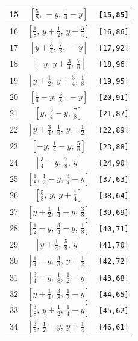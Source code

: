 \documentclass[fleqn,8pt]{jsarticle}
\begin{document}
\begin{longtable}{ccc}
15 & $\left[ \frac{5}{8},\, - y,\, \frac{1}{4} - y \right]$ & {\tt [15,85]} \\ \hline
16 & $\left[ \frac{1}{8},\, y + \frac{1}{2},\, y + \frac{3}{4} \right]$ & {\tt [16,86]} \\ \hline
17 & $\left[ y + \frac{3}{4},\, \frac{7}{8},\, - y \right]$ & {\tt [17,92]} \\ \hline
18 & $\left[ - y,\, y + \frac{3}{4},\, \frac{7}{8} \right]$ & {\tt [18,96]} \\ \hline
19 & $\left[ y + \frac{1}{2},\, y + \frac{3}{4},\, \frac{1}{8} \right]$ & {\tt [19,95]} \\ \hline
20 & $\left[ \frac{1}{4} - y,\, \frac{5}{8},\, - y \right]$ & {\tt [20,91]} \\ \hline
21 & $\left[ y,\, \frac{3}{4} - y,\, \frac{7}{8} \right]$ & {\tt [21,87]} \\ \hline
22 & $\left[ y + \frac{3}{4},\, \frac{1}{8},\, y + \frac{1}{2} \right]$ & {\tt [22,89]} \\ \hline
23 & $\left[ - y,\, \frac{1}{4} - y,\, \frac{5}{8} \right]$ & {\tt [23,88]} \\ \hline
24 & $\left[ \frac{3}{4} - y,\, \frac{7}{8},\, y \right]$ & {\tt [24,90]} \\ \hline
25 & $\left[ \frac{1}{8},\, \frac{1}{2} - y,\, \frac{3}{4} - y \right]$ & {\tt [37,63]} \\ \hline
26 & $\left[ \frac{5}{8},\, y,\, y + \frac{1}{4} \right]$ & {\tt [38,64]} \\ \hline
27 & $\left[ y + \frac{1}{2},\, \frac{1}{4} - y,\, \frac{3}{8} \right]$ & {\tt [39,69]} \\ \hline
28 & $\left[ \frac{1}{2} - y,\, \frac{3}{4} - y,\, \frac{1}{8} \right]$ & {\tt [40,71]} \\ \hline
29 & $\left[ y + \frac{1}{4},\, \frac{5}{8},\, y \right]$ & {\tt [41,70]} \\ \hline
30 & $\left[ \frac{1}{4} - y,\, \frac{3}{8},\, y + \frac{1}{2} \right]$ & {\tt [42,72]} \\ \hline
31 & $\left[ \frac{3}{4} - y,\, \frac{1}{8},\, \frac{1}{2} - y \right]$ & {\tt [43,68]} \\ \hline
32 & $\left[ y + \frac{1}{4},\, \frac{3}{8},\, \frac{1}{2} - y \right]$ & {\tt [44,65]} \\ \hline
33 & $\left[ \frac{3}{8},\, y + \frac{1}{2},\, \frac{1}{4} - y \right]$ & {\tt [45,62]} \\ \hline
34 & $\left[ \frac{3}{8},\, \frac{1}{2} - y,\, y + \frac{1}{4} \right]$ & {\tt [46,61]} \\ \hline

\end{longtable}
\end{document}
